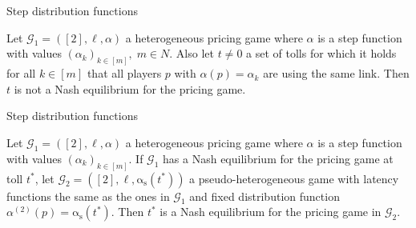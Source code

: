 \documentclass{beamer}
\newcommand{\as}{\mathrm{\alpha_s}}
\newcommand{\Gm}{\mathcal{G}}
\begin{document}
\begin{frame}{Step distribution functions}
	\begin{lemma}
		Let $\Gm_1 = ([2], \ell, \alpha)$ a heterogeneous pricing game where $\alpha$ is a step function with values $(\alpha_k)_{k \in [m]}, \; m \in N$.
		Also let $t \ne 0$ a set of tolls for which it holds for all $k \in [m]$ that all players $p$ with $\alpha(p) = \alpha_k$ are using the same link.
		Then $t$ is not a Nash equilibrium for the pricing game.
	\end{lemma}
\end{frame}

\begin{frame}{Step distribution functions}
	\begin{theorem}
		Let $\Gm_1 = ([2], \ell, \alpha)$ a heterogeneous pricing game where $\alpha$ is a step function with values $(\alpha_k)_{k \in [m]}$.
		If $\Gm_1$ has a Nash equilibrium for the pricing game at toll $t^*$, let $\Gm_2 = ([2], \ell, \as(t^*))$ a pseudo-heterogeneous game with latency functions the same as the ones in $\Gm_1$ and fixed distribution function $\alpha^{(2)}(p) = \as(t^*)$.
		Then $t^*$ is a Nash equilibrium for the pricing game in $\Gm_2$.
	\end{theorem}
\end{frame}
\end{document}
